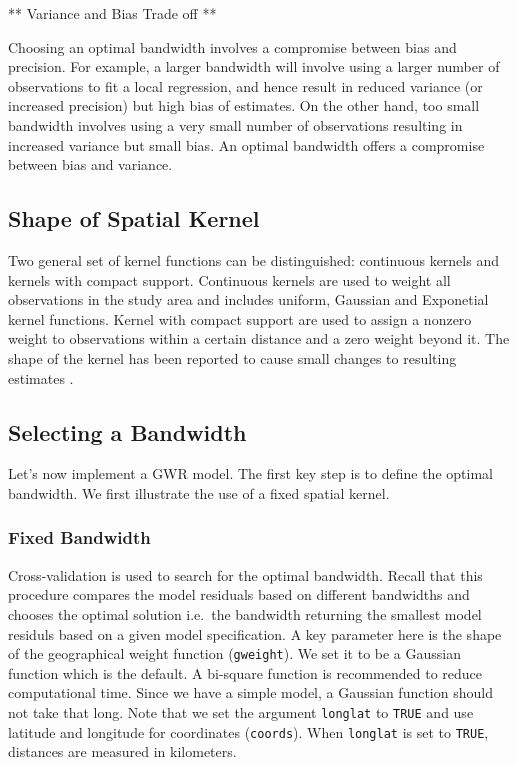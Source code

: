 \documentclass[]{book}
\begin{document}
** Variance and Bias Trade off **

Choosing an optimal bandwidth involves a compromise between bias and
precision. For example, a larger bandwidth will involve using a larger
number of observations to fit a local regression, and hence result in
reduced variance (or increased precision) but high bias of estimates. On
the other hand, too small bandwidth involves using a very small number
of observations resulting in increased variance but small bias. An
optimal bandwidth offers a compromise between bias and variance.

\subsection{Shape of Spatial Kernel}\label{shape-of-spatial-kernel}

Two general set of kernel functions can be distinguished: continuous
kernels and kernels with compact support. Continuous kernels are used to
weight all observations in the study area and includes uniform, Gaussian
and Exponetial kernel functions. Kernel with compact support are used to
assign a nonzero weight to observations within a certain distance and a
zero weight beyond it. The shape of the kernel has been reported to
cause small changes to resulting estimates
\citep{brunsdon1998geographically}.

\subsection{Selecting a Bandwidth}\label{selecting-a-bandwidth}

Let's now implement a GWR model. The first key step is to define the
optimal bandwidth. We first illustrate the use of a fixed spatial
kernel.

\subsubsection{Fixed Bandwidth}\label{fixed-bandwidth}

Cross-validation is used to search for the optimal bandwidth. Recall
that this procedure compares the model residuals based on different
bandwidths and chooses the optimal solution i.e.~the bandwidth returning
the smallest model residuls based on a given model specification. A key
parameter here is the shape of the geographical weight function
(\texttt{gweight}). We set it to be a Gaussian function which is the
default. A bi-square function is recommended to reduce computational
time. Since we have a simple model, a Gaussian function should not take
that long. Note that we set the argument \texttt{longlat} to
\texttt{TRUE} and use latitude and longitude for coordinates
(\texttt{coords}). When \texttt{longlat} is set to \texttt{TRUE},
distances are measured in kilometers.
\end{document}
